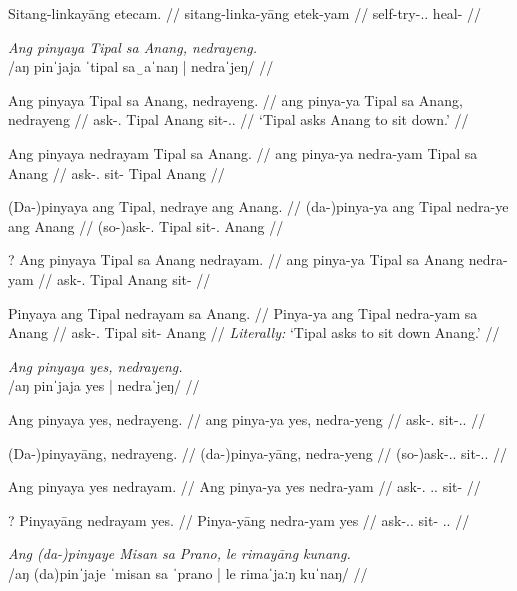 \documentclass[12pt,a4paper]{scrartcl}
\newcommand{\TsgM}{{\Tsg}.{\M}}
\newcommand{\TsgF}{{\Tsg}.{\F}}
\begin{document}
\a\ljudge*\begingl
\gla Sitang-linkayāng etecam. //
\glb sitang-linka-yāng etek-yam //
\glc self-try-\TsgM{}.\Aarg{} heal-\Ptcp{} //
\endgl
\xe

\pex
\a\begingl
\glpreamble \textit{Ang pinyaya Tipal sa Anang, nedrayeng.} \\
	/aŋ pinˈjaja ˈtipal sa‿aˈnaŋ | nedraˈjeŋ/ //

\gla Ang pinyaya Tipal sa Anang, nedrayeng. //
\glb ang pinya-ya Tipal sa Anang, nedrayeng //
\glc \AgtT{} ask-\TsgM{} Tipal \Parg{} Anang sit-\TsgM{}.\Aarg{} //
\glft `Tipal asks Anang to sit down.' //
\endgl

\a\begingl
\gla Ang pinyaya nedrayam Tipal sa Anang. //
\glb ang pinya-ya nedra-yam Tipal sa Anang //
\glc \AgtT{} ask-\TsgM{} sit-\Ptcp{} Tipal \Parg{} Anang //
\endgl

\a\begingl
\gla (Da-)pinyaya ang Tipal, nedraye ang Anang. //
\glb (da-)pinya-ya ang Tipal nedra-ye ang Anang //
\glc (so-)ask-\TsgM{} \Aarg{} Tipal sit-\TsgF{} \Aarg{} Anang //
\endgl

\a\ljudge?\begingl
\gla Ang pinyaya Tipal sa Anang nedrayam. //
\glb ang pinya-ya Tipal sa Anang nedra-yam //
\glc \AgtT{} ask-\TsgM{} Tipal \Parg{} Anang sit-\Ptcp{} //
\endgl

\a\ljudge*\begingl
\gla Pinyaya ang Tipal nedrayam sa Anang. //
\glb Pinya-ya ang Tipal nedra-yam sa Anang //
\glc ask-\TsgM{} \Aarg{} Tipal sit-\Ptcp{} \Parg{} Anang //
\glft \textit{Literally:} `Tipal asks to sit down Anang.' //
\endgl

\xe

\pex
\a\begingl
\glpreamble \textit{Ang pinyaya yes, nedrayeng.} \\
	/aŋ pinˈjaja yes | nedraˈjeŋ/ //

\gla Ang pinyaya yes, nedrayeng. //
\glb ang pinya-ya yes, nedra-yeng //
\glc \AgtT{} ask-\TsgM{} sit-\TsgF{}.\Aarg{} //
\endgl

\a\begingl
\gla (Da-)pinyayāng, nedrayeng. //
\glb (da-)pinya-yāng, nedra-yeng //
\glc (so-)ask-\TsgM{}.\Aarg{} sit-\TsgF{}.\Aarg{} //
\endgl

\a\begingl
\gla Ang pinyaya yes nedrayam. //
\glb Ang pinya-ya yes nedra-yam //
\glc \AgtT{} ask-\TsgM{} \TsgF{}.\Parg{} sit-\Ptcp{} //
\endgl

\a\ljudge?\begingl
\gla Pinyayāng nedrayam yes. //
\glb Pinya-yāng nedra-yam yes //
\glc ask-\TsgM{}.\Aarg{} sit-\Ptcp{} \TsgF{}.\Parg{} //
\endgl
\xe

\pex
\a\begingl
\glpreamble \textit{Ang (da-)pinyaye Misan sa Prano, le rimayāng kunang.} \\
	/aŋ (da)pinˈjaje ˈmisan sa ˈprano | le rimaˈjaːŋ kuˈnaŋ/ //
\end{document}
